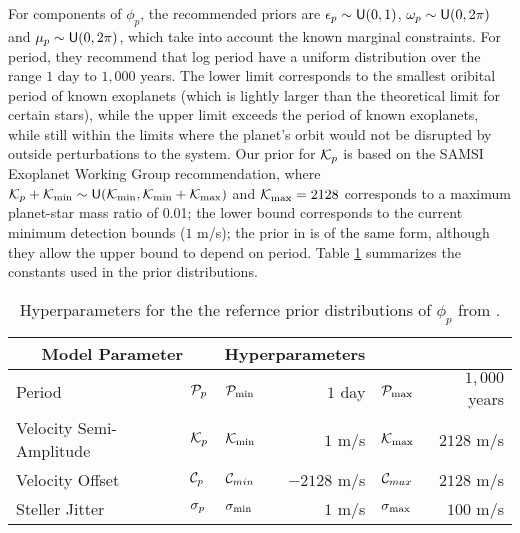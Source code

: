 For components of $\phi_p$, the recommended priors are  $\e_p \sim \U(0,1)$, $\omega_p \sim \U(0, 2
\pi)$ and $\mu_p \sim \U(0, 2 \pi)$, which take into account the known
marginal constraints.  For period, they recommend that log period have
a uniform distribution over the range $1$ day to $1,000$ years.  The
lower limit corresponds to the smallest oribital period of known
exoplanets (which is lightly larger than the theoretical limit for
certain stars), while the upper limit exceeds the period of known
exoplanets, while still within the limits where the planet's orbit would not be
disrupted by outside perturbations to the system.  Our prior for $\K_p$
is based on the SAMSI Exoplanet Working Group recommendation, where
$\K_p + \K_{\min} \sim  \U(\K_{\min}, \K_{\min} + \K_{\max})$ and 
$\K_{\max} = 2128$ corresponds to a maximum 
planet-star mass ratio of 0.01;  the lower bound corresponds to the
current minimum detection bounds ($1$ m/s); the prior in
\citet{ford2006bms} is of the same form, although they allow the upper
bound to depend on period.  Table \ref{tab:hyper} summarizes the
constants used in the prior distributions.
\begin{table}[h]
  \begin{center}
  \begin{tabular} {|ll|lr|lr|} \hline \hline
\multicolumn{2}{|c}{Model Parameter} &
\multicolumn{2}{|c|}{Hyperparameters}  \\ \hline
Period & $\P_p$ & $\P_{\min}$ &  $1$ day & $\P_{\max}$ &  $1,000$ years \\
Velocity Semi-Amplitude &$\K_p$ & $\K_{\min}$ &  $ 1$ m/s &  $\K_{\max}$ &  $2128$ m/s \\
Velocity Offset & $\C_p$ & $\C_{min}$ &  $-2128$ m/s & $\C_{max}$ &   $2128$ m/s \\
Steller Jitter & $\sj_p$  &$\sj_{\min}$ &  $1$ m/s & $\sj_{\max}$ &  $100$ m/s \\ \hline
  \end{tabular}
  \end{center}
\caption{Hyperparameters for the the refernce prior distributions of
  $\phi_p$ from \citet{ford2006bms}.}
\label{tab:hyper}
\end{table} 




